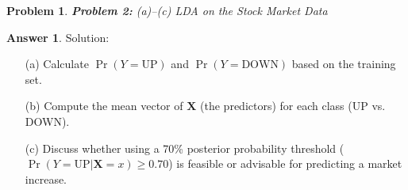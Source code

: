 \documentclass[12pt]{article}
\newtheorem{problem}{Problem} %
\theoremstyle{definition}
\newtheorem*{answer}{Answer}
\newcommand{\solution}{\textcolor{PineGreen}{Solution:\newline}}
\begin{document}
\setcounter{problem}{1}
\begin{problem}
\textbf{Problem 2:} (a)--(c) LDA on the Stock Market Data
\end{problem}

\begin{answer}
\solution
\begin{itemize}
    \item[(a)] Calculate \(\Pr(Y = \text{UP})\) and \(\Pr(Y = \text{DOWN})\) based on the training set.
    \item[(b)] Compute the mean vector of \(\mathbf{X}\) (the predictors) for each class (UP vs. DOWN).
    \item[(c)] Discuss whether using a 70\% posterior probability threshold (\(\Pr(Y=\text{UP}|\mathbf{X}=x) \ge 0.70\)) is feasible or advisable for predicting a market increase.
\end{itemize}
\end{answer}
\end{document}
